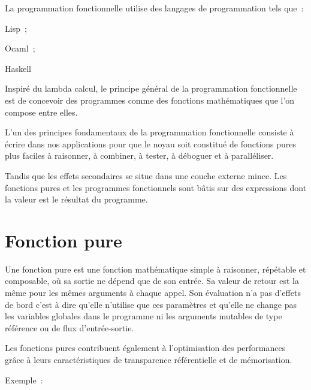 \documentclass[12pt]{article}
\begin{document}
La programmation fonctionnelle utilise des langages de programmation tels que :\par

\setlength{\parskip}{8.04pt}
Lisp ;\par

Ocaml ;\par

Haskell\par

Inspiré du lambda calcul, le principe général de la programmation fonctionnelle est de concevoir des programmes comme des fonctions mathématiques que l'on compose entre elles.\textcolor[HTML]{212121}{ }\par

\textcolor[HTML]{212121}{L'un des principes fondamentaux de la programmation fonctionnelle consiste à écrire dans nos applications pour que le noyau soit constitué de fonctions pures plus faciles à raisonner, à combiner, à tester, à déboguer et à paralléliser}. \par

Tandis que les effets secondaires se situe dans une couche externe mince. Les fonctions pures et les programmes fonctionnels sont bâtis sur des expressions dont la valeur est le résultat du programme.\par

\section*{Fonction pure}
Une fonction pure est une fonction mathématique simple à raisonner, répétable et composable, où sa sortie ne dépend que de son entrée. Sa valeur de retour est la même pour les mêmes arguments à chaque appel. Son évaluation n’a pas d’effets de bord c’est à dire qu’elle n’utilise que ces paramètres et qu’elle ne change pas les variables globales dans le programme ni les arguments mutables de type référence ou de flux d’entrée-sortie.\par

Les fonctions pures contribuent également à l’optimisation des performances grâce à leurs caractéristiques de transparence référentielle et de mémorisation.\par

Exemple :\par



\end{document}
